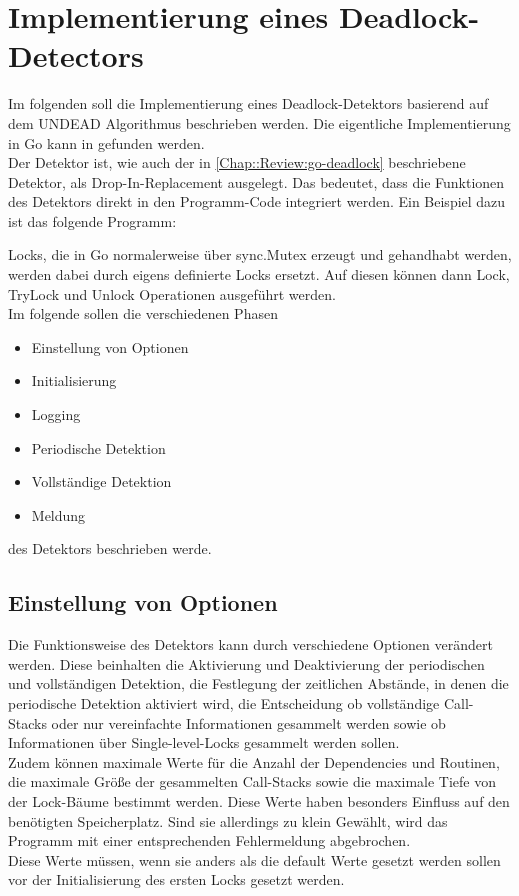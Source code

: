 \chapter{Implementierung eines Deadlock-Detectors}\label{Chap::Implementation}
Im folgenden soll die Implementierung eines Deadlock-Detektors basierend auf
dem UNDEAD Algorithmus \cite{zhou} beschrieben werden. Die eigentliche 
Implementierung in Go kann in \cite{implementation} gefunden werden.\\
Der Detektor ist, wie auch der in \ref{Chap::Review:go-deadlock} beschriebene 
Detektor, als Drop-In-Replacement ausgelegt. Das bedeutet, dass die 
Funktionen des Detektors direkt in den Programm-Code integriert werden. Ein 
Beispiel dazu ist das folgende Programm:
\begin{figure}[H]
    
\end{figure}
Locks, die in Go normalerweise über sync.Mutex erzeugt und gehandhabt werden, 
werden dabei durch eigens definierte Locks ersetzt. Auf diesen können dann Lock, 
TryLock und Unlock Operationen ausgeführt werden.\\
Im folgende sollen die verschiedenen Phasen 
\begin{itemize}
    \item Einstellung von Optionen
    \item Initialisierung
    \item Logging
    \item Periodische Detektion
    \item Vollständige Detektion
    \item Meldung
\end{itemize}
des Detektors beschrieben werde. 


\section{Einstellung von Optionen} \label{Chap::Implementation:Options}
Die Funktionsweise des Detektors kann durch verschiedene Optionen 
verändert werden. Diese beinhalten die Aktivierung und Deaktivierung der 
periodischen und vollständigen Detektion, die Festlegung der zeitlichen Abstände, in denen 
die periodische Detektion aktiviert wird, die Entscheidung ob vollständige 
Call-Stacks oder nur vereinfachte Informationen gesammelt werden sowie 
ob Informationen über Single-level-Locks gesammelt werden sollen.\\
Zudem können maximale Werte für die Anzahl der Dependencies und Routinen, 
die maximale Größe der gesammelten Call-Stacks sowie die maximale Tiefe von 
der Lock-Bäume bestimmt werden. Diese Werte haben besonders Einfluss auf den 
benötigten Speicherplatz. Sind sie allerdings zu klein Gewählt, wird das 
Programm mit einer entsprechenden Fehlermeldung abgebrochen.\\
Diese Werte müssen, wenn sie anders als die default Werte gesetzt werden sollen 
vor der Initialisierung des ersten Locks gesetzt werden.

